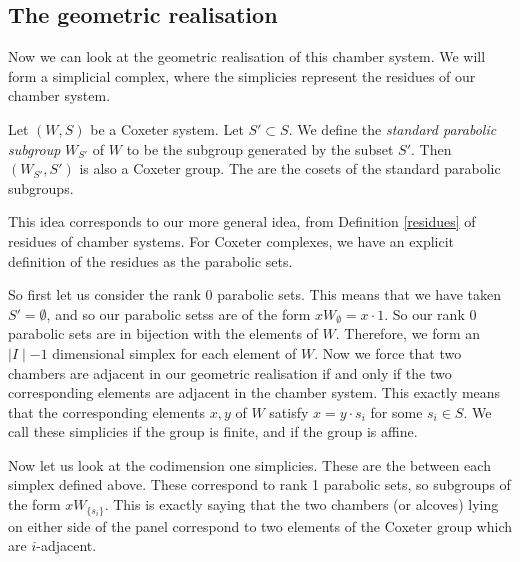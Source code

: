 \documentclass[11pt]{article}
\begin{document}
\subsection{The geometric realisation}
Now we can look at the geometric realisation of this chamber system. We will form a simplicial complex, where the simplicies represent the residues of our chamber system. 



\begin{definition}
    Let $(W,S)$ be a Coxeter system. Let $S'\subset S$. We define the \textit{standard parabolic subgroup} $W_{S'}$ of $W$ to be the subgroup generated by the subset $S'$. Then $(W_{S'},S')$ is also a Coxeter group. The  are the cosets of the standard parabolic subgroups. 
\end{definition}

This idea corresponds to our more general idea, from Definition \ref{residues} of residues of chamber systems. For Coxeter complexes, we have an explicit definition of the residues as the parabolic sets. 

So first let us consider the rank 0 parabolic sets. This means that we have taken $S'=\emptyset$, and so our parabolic setss are of the form $xW_\emptyset=x\cdot{1}$. So our rank 0 parabolic sets are in bijection with the elements of $W$. Therefore, we form an $\mid I\mid -1$ dimensional simplex for each element of $W$. Now we force that two chambers are adjacent in our geometric realisation if and only if the two corresponding elements are adjacent in the chamber system. This exactly means that the corresponding elements $x,y$ of $W$ satisfy $x=y\cdot s_i$ for some $s_i\in S$. We call these simplicies  if the group is finite, and  if the group is affine.

Now let us look at the codimension one simplicies. These are the  between each simplex defined above. These correspond to rank 1 parabolic sets, so subgroups of the form $xW_{\{s_i\}}$. This is exactly saying that the two chambers (or alcoves) lying on either side of the panel correspond to two elements of the Coxeter group which are $i$-adjacent. 


\end{document}
